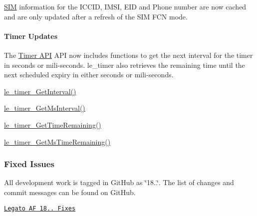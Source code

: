 \hyperlink{c_sim}{S\+IM} information for the I\+C\+C\+ID, I\+M\+SI, E\+ID and Phone number are now cached and are only updated after a refresh of the S\+IM F\+CN mode.\hypertarget{releaseNotes18030_rn1803_Features_Timer}{}\paragraph{Timer Updates}\label{releaseNotes18030_rn1803_Features_Timer}
The \hyperlink{c_timer}{Timer A\+PI} A\+PI now includes functions to get the next interval for the timer in seconds or mili-\/seconds. le\+\_\+timer also retrieves the remaining time until the next scheduled expiry in either seconds or mili-\/seconds.
\begin{DoxyItemize}
\item \hyperlink{le__timer_8h_a2036a01925bc85b3c477b45e6c3703aa}{le\+\_\+timer\+\_\+\+Get\+Interval()}
\item \hyperlink{le__timer_8h_aa9defca5b3334e1d002b2386b11ae72b}{le\+\_\+timer\+\_\+\+Get\+Ms\+Interval()}
\item \hyperlink{le__timer_8h_a0eeee8aaae982b43bc8b3cb46d1c6c9d}{le\+\_\+timer\+\_\+\+Get\+Time\+Remaining()}
\item \hyperlink{le__timer_8h_a08968a04f934e650b40ee496010ed6bb}{le\+\_\+timer\+\_\+\+Get\+Ms\+Time\+Remaining()}
\end{DoxyItemize}\hypertarget{releaseNotes18030_rn1803_Fixes}{}\subsubsection{Fixed Issues}\label{releaseNotes18030_rn1803_Fixes}
All development work is tagged in Git\+Hub as \char`\"{}18..\char`\"{}. The list of changes and commit messages can be found on Git\+Hub.


\begin{DoxyItemize}
\item \href{https://github.com/legatoproject/legato-af/commits/18.03.0}{\tt Legato AF 18.. Fixes}
\end{DoxyItemize}

